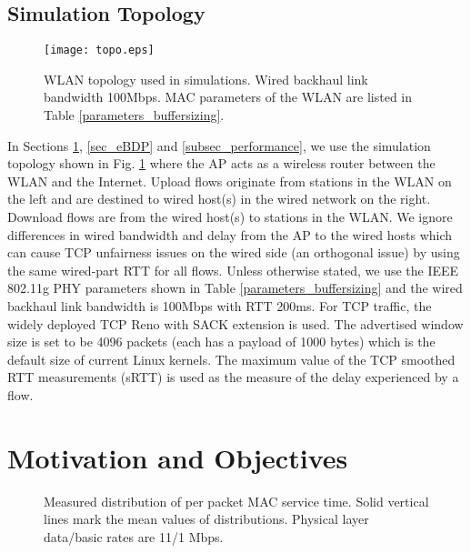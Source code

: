 \documentclass[10pt,twocolumn, journal]{IEEEtran}
\begin{document}
\subsection{Simulation Topology}
\begin{figure}[tb]
    \centering
    \texttt{[image: topo.eps]}
    \caption{WLAN topology used in simulations. Wired backhaul link bandwidth 100Mbps.
    MAC parameters of the WLAN are listed in Table \ref{parameters_buffersizing}.}
    \label{fig_topo_simu}
\end{figure}
In Sections \ref{sec_fixed}, \ref{sec_eBDP} and \ref{subsec_performance}, we use the simulation
topology shown in Fig. \ref{fig_topo_simu} where the AP acts as a wireless
router between the WLAN and the Internet. Upload flows originate from stations in the
WLAN on the left and are destined to wired host(s) in the wired network on the right.
Download flows are from the wired host(s) to stations in the WLAN. We ignore differences
in wired bandwidth and delay from the AP to the wired hosts which can cause TCP
unfairness issues on the wired side (an orthogonal issue) by using the same wired-part
RTT for all flows.  Unless otherwise stated, we use the IEEE 802.11g PHY parameters shown in Table
\ref{parameters_buffersizing} and the wired backhaul link bandwidth is 100Mbps with RTT 200ms.  For TCP traffic, the widely deployed TCP Reno with SACK extension is used.  The advertised window size is set to be 4096 packets (each has a payload of 1000 bytes) which is the default size of current Linux kernels. The maximum value of the TCP smoothed RTT measurements (sRTT) is used as the measure of the delay experienced by a flow.

\section{Motivation and Objectives}\label{sec_fixed}

\begin{figure}[tb]
	\centering
	\caption{Measured distribution of per packet MAC service time. Solid vertical lines mark the mean values of distributions. Physical layer data/basic rates are 11/1 Mbps. }\label{fig:802.11_0}
\end{figure}
\end{document}
